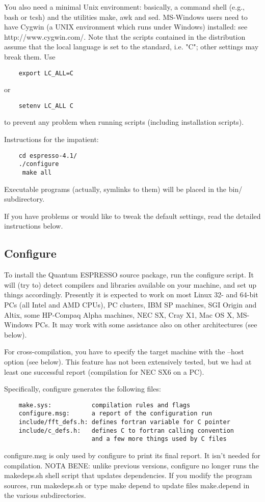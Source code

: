 \documentclass[12pt,a4paper]{article}
\begin{document}
You also need a minimal Unix environment: basically, a command shell (e.g.,
bash or tcsh) and the utilities make, awk and sed. MS-Windows users need
to have Cygwin (a UNIX environment which runs under Windows) installed:
see http://www.cygwin.com/. Note that the scripts contained in the distribution
assume that the local  language is set to the standard, i.e. "C"; other
 settings 
may break them. Use
\begin{verbatim}
    export LC_ALL=C
\end{verbatim}
or
\begin{verbatim}
    setenv LC_ALL C
\end{verbatim}
to prevent any problem when running scripts (including installation scripts).

Instructions for the impatient:
\begin{verbatim}
    cd espresso-4.1/
    ./configure
     make all
\end{verbatim}
Executable programs (actually, symlinks to them) will be placed in the bin/
subdirectory.
    
If you have problems or would like to tweak the default settings, read the
detailed instructions below.

\subsection{Configure}

To install the Quantum ESPRESSO source package, run the configure
script. It will (try to) detect compilers and libraries available on
your machine, and set up things accordingly. Presently it is expected
to work on most Linux 32- and 64-bit PCs (all Intel and AMD CPUs), PC
clusters, IBM SP machines, SGI Origin and Altix, some HP-Compaq Alpha
machines, NEC SX, Cray X1, Mac OS X, MS-Windows PCs. It may work with
some assistance also on other architectures (see below). 
    
For cross-compilation, you have to specify the target machine with the
--host option (see below). This feature has not been extensively
tested, but we had at least one successful report (compilation for NEC
SX6 on a PC). 
    
Specifically, configure generates the following files:
\begin{verbatim}
    make.sys:           compilation rules and flags
    configure.msg:      a report of the configuration run
    include/fft_defs.h: defines fortran variable for C pointer
    include/c_defs.h:   defines C to fortran calling convention
                        and a few more things used by C files
\end{verbatim}
configure.msg is only used by configure to print its final report. It isn't
needed for compilation. NOTA BENE: unlike previous versions, configure
no longer runs the makedeps.sh shell script that updates dependencies. If
you modify the program sources, run makedeps.sh or type make depend to
update files make.depend in the various subdirectories.
    
\end{document}
